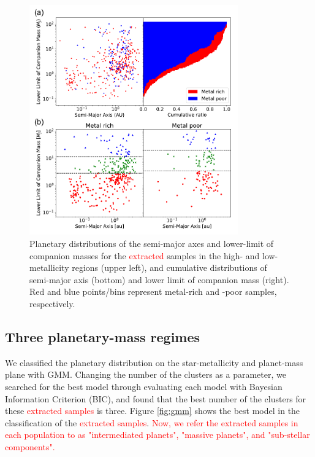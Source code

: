 \documentclass[twocolumn, dvipdfmx]{aastex62}
\def\red<#1>{\textcolor{red}{#1}}
\begin{document}
\begin{CJK*}{UTF8}{min}
\begin{figure}[t]
\begin{center}
\includegraphics[width=9cm]{../../../Figure/a_Mp.pdf}
\caption{Planetary distributions of the semi-major axes and lower-limit of companion masses for the \red<extracted> samples in the high- and low-metallicity regions (upper left), and cumulative distributions of semi-major axis (bottom) and lower limit of companion mass (right). Red and blue points/bins represent metal-rich and -poor samples, respectively. \label{fig:a_Mp}}
\end{center}
\end{figure}


\subsection{Three planetary-mass regimes} \label{subsec:mass}

We classified the planetary distribution on the star-metallicity and planet-mass plane with GMM. Changing the number of the clusters as a parameter, we searched for the best model through evaluating each model with Bayesian Information Criterion (BIC), and found that the best number of the clusters for these \red<extracted samples> is three. Figure \ref{fig:gmm} shows the best model in the classification of the \red<extracted samples>. \red<Now, we refer the extracted samples in each population to as "intermediated planets", "massive planets", and "sub-stellar components".>


\end{CJK*}
\end{document}
